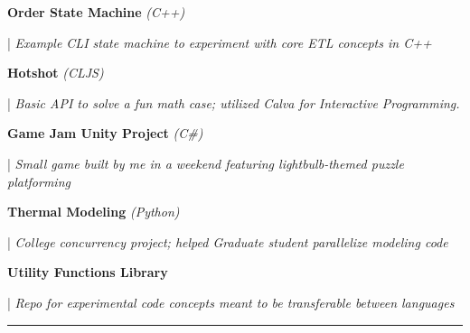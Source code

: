 \documentclass[letterpaper,11pt]{article}
\begin{document}
\begin{minipage}[t]{0.28\textwidth}
  \raggedright
  \textbf{ Order State Machine }\textit{(C++)}\\
\end{minipage}
\hfill
\begin{minipage}[t]{0.70\textwidth}
  \raggedright
  |\textit{ Example CLI state machine to experiment with core ETL concepts in C++ } \\
\end{minipage}

\begin{minipage}[t]{0.28\textwidth}
  \raggedright
  \textbf{ Hotshot }\textit{(CLJS)}\\
\end{minipage}
\hfill
\begin{minipage}[t]{0.70\textwidth}
  \raggedright
  |\textit{ Basic API to solve a fun math case; utilized Calva for Interactive Programming.  } \\
\end{minipage}

\begin{minipage}[t]{0.28\textwidth}
  \raggedright
  \textbf{ Game Jam Unity Project }\textit{(C\#)} \\
\end{minipage}
\hfill
\begin{minipage}[t]{0.70\textwidth}
  \raggedright
  |\textit{ Small game built by me in a weekend featuring lightbulb-themed puzzle platforming} \\
\end{minipage}

\begin{minipage}[t]{0.28\textwidth}
  \raggedright
  \textbf{ Thermal Modeling }\textit{(Python)}\\
\end{minipage}
\hfill
\begin{minipage}[t]{0.70\textwidth}
  \raggedright
  |\textit{ College concurrency project; helped Graduate student parallelize modeling code } \\
\end{minipage}

\begin{minipage}[t]{0.28\textwidth}
  \raggedright
  \textbf{ Utility Functions Library } \\
\end{minipage}
\hfill
\begin{minipage}[t]{0.70\textwidth}
  \raggedright
  |\textit{ Repo for experimental code concepts meant to be transferable between languages } \\
\end{minipage}
\noindent\rule{19.5cm}{0.4pt}
\end{document}
